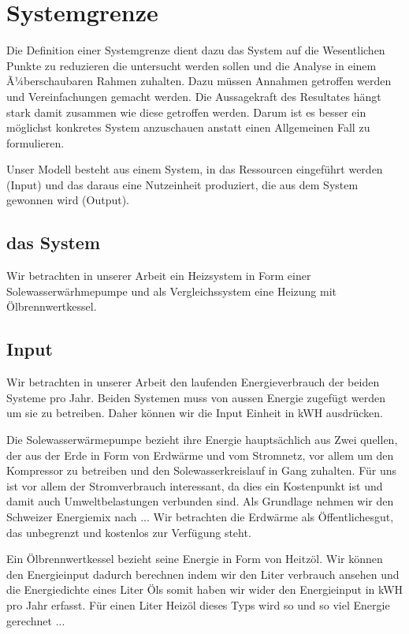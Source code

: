 \chapter{Systemgrenze}
\label{chap:Systemgrenze}

Die Definition einer Systemgrenze dient dazu das System auf die Wesentlichen
Punkte zu reduzieren die untersucht werden sollen und die Analyse in einem
Ã¼berschaubaren Rahmen zuhalten.
Dazu müssen Annahmen getroffen werden und Vereinfachungen gemacht werden.
Die Aussagekraft des Resultates hängt stark damit zusammen wie diese getroffen
werden. Darum ist es besser ein möglichst konkretes System anzuschauen anstatt
einen Allgemeinen Fall zu formulieren.

Unser Modell besteht aus einem System, in das Ressourcen eingeführt werden
(Input) und das daraus eine Nutzeinheit produziert, die aus dem System gewonnen
wird (Output).

\section{das System}

Wir betrachten in unserer Arbeit ein Heizsystem in Form einer
Solewasserwärhmepumpe und als Vergleichssystem eine Heizung mit
Ölbrennwertkessel.

\section{Input}

Wir betrachten in unserer Arbeit den laufenden Energieverbrauch der beiden
Systeme pro Jahr.
Beiden Systemen muss von aussen Energie zugefügt werden um sie zu betreiben.
Daher können wir die Input Einheit in kWH ausdrücken.

Die Solewasserwärmepumpe bezieht ihre Energie hauptsächlich aus Zwei quellen,
der aus der Erde in Form von Erdwärme und vom Stromnetz, vor allem um den
Kompressor zu betreiben und den Solewasserkreislauf in Gang zuhalten.
Für uns ist vor allem der Stromverbrauch interessant, da dies ein Kostenpunkt
ist und damit auch Umweltbelastungen verbunden sind.
Als Grundlage nehmen wir den Schweizer Energiemix nach ...
Wir betrachten die Erdwärme als Öffentlichesgut, das unbegrenzt und kostenlos
zur Verfügung steht.

Ein Ölbrennwertkessel bezieht seine Energie in Form von Heitzöl.
Wir können den Energieinput dadurch berechnen indem wir den Liter verbrauch
ansehen und die Energiedichte eines Liter Öls somit haben wir wider den
Energieinput in kWH pro Jahr erfasst.
Für einen Liter Heizöl dieses Typs wird so und so viel Energie gerechnet ...

